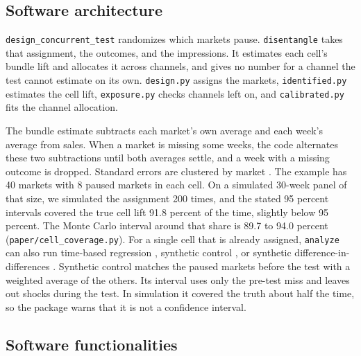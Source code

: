 \documentclass[preprint,12pt]{elsarticle}
\begin{document}
\subsection{Software architecture}
\label{sec:architecture}

\begin{sloppypar}
\texttt{design\_\allowbreak concurrent\_\allowbreak test} randomizes which markets pause. \texttt{disen\-tangle} takes that assignment, the outcomes, and the impressions. It estimates each cell's bundle lift and allocates it across channels, and gives no number for a channel the test cannot estimate on its own. \texttt{design.py} assigns the markets, \texttt{identified.py} estimates the cell lift, \texttt{exposure.py} checks channels left on, and \texttt{calibrated.py} fits the channel allocation.
\end{sloppypar}

The bundle estimate subtracts each market's own average and each week's average from sales. When a market is missing some weeks, the code alternates these two subtractions until both averages settle, and a week with a missing outcome is dropped. Standard errors are clustered by market \cite{wooldridge2010,bertrand2004,cameron2015}. The example has 40 markets with 8 paused markets in each cell. On a simulated 30-week panel of that size, we simulated the assignment 200 times, and the stated 95 percent intervals covered the true cell lift 91.8 percent of the time, slightly below 95 percent. The Monte Carlo interval around that share is 89.7 to 94.0 percent (\texttt{paper/cell\_coverage.py}). For a single cell that is already assigned, \texttt{analyze} can also run time-based regression \cite{kerman2017}, synthetic control \cite{abadie2010,xu2017}, or synthetic difference-in-differences \cite{arkhangelsky2021}. Synthetic control matches the paused markets before the test with a weighted average of the others. Its interval uses only the pre-test miss and leaves out shocks during the test. In simulation it covered the truth about half the time, so the package warns that it is not a confidence interval.

\subsection{Software functionalities}
\label{sec:function}
\end{document}
